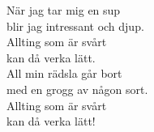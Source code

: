 \documentclass[a6paper, 10pt, twoside]{article}
\begin{document}
\newpage
\noindent
\begin{center}
\end{center}
\begin{lyrics}
När jag tar mig en sup \\
blir jag intressant och djup. \\
Allting som är svårt \\
kan då verka lätt. 
\vspace{5pt}\\
All min rädsla går bort \\
med en grogg av någon sort. \\
Allting som är svårt \\
kan då verka lätt! 
\end{lyrics}
\end{document}
